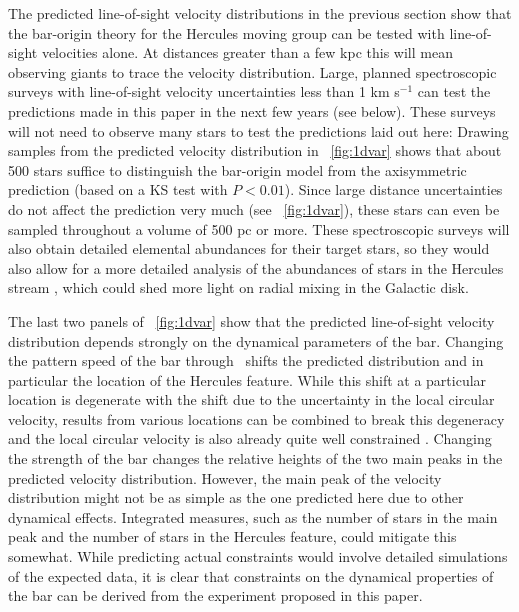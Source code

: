The predicted line-of-sight velocity distributions in the previous
section show that the bar-origin theory for the Hercules moving group
can be tested with line-of-sight velocities alone. At distances
greater than a few kpc this will mean observing giants to trace the
velocity distribution. Large, planned spectroscopic surveys with
line-of-sight velocity uncertainties less than 1 km s$^{-1}$ can test
the predictions made in this paper in the next few years (see
below). These surveys will not need to observe many stars to test the
predictions laid out here: Drawing samples from the predicted velocity
distribution in \figurename~\ref{fig:1dvar} shows that about 500 stars
suffice to distinguish the bar-origin model from the axisymmetric
prediction (based on a KS test with $P < 0.01$). Since large distance
uncertainties do not affect the prediction very much (see
\figurename~\ref{fig:1dvar}), these stars can even be sampled
throughout a volume of 500 pc or more. These spectroscopic surveys
will also obtain detailed elemental abundances for their target stars,
so they would also allow for a more detailed analysis of the
abundances of stars in the Hercules stream \citep[following,
  \eg,][]{Bensby07a,Bovy10a}, which could shed more light on radial
mixing in the Galactic disk.

The last two panels of \figurename~\ref{fig:1dvar} show that the
predicted line-of-sight velocity distribution depends strongly on the
dynamical parameters of the bar. Changing the pattern speed of the bar
through \Rolr\ shifts the predicted distribution and in particular the
location of the Hercules feature. While this shift at a particular
location is degenerate with the shift due to the uncertainty in the
local circular velocity, results from various locations can be
combined to break this degeneracy and the local circular velocity is
also already quite well constrained \citep[\eg,][]{Bovy09b}. Changing
the strength of the bar changes the relative heights of the two main
peaks in the predicted velocity distribution. However, the main peak
of the velocity distribution might not be as simple as the one
predicted here due to other dynamical effects. Integrated measures,
such as the number of stars in the main peak and the number of stars
in the Hercules feature, could mitigate this somewhat. While
predicting actual constraints would involve detailed simulations of
the expected data, it is clear that constraints on the dynamical
properties of the bar can be derived from the experiment proposed in
this paper.

